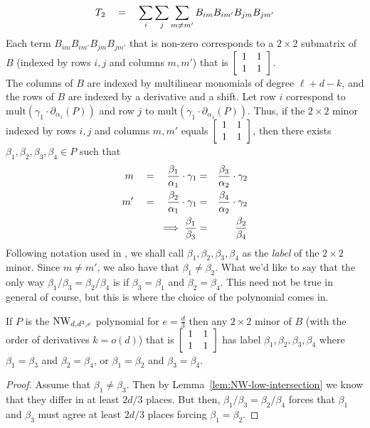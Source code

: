 \[
T_2 \quad = \quad \sum_i \sum_j \sum_{m\neq m'} B_{im}B_{im'}B_{jm}B_{jm'}
\]
Each term $B_{im}B_{im'}B_{jm}B_{jm'}$ that is non-zero corresponds to a $2\times 2$ submatrix of $B$ (indexed by rows $i,j$ and columns $m,m'$) that is $\left[\begin{array}{cc} 1 & 1\\ 1&1
  \end{array}\right]$. \\

The columns of $B$ are indexed by multilinear monomials of degree $\ell + d - k$, and the rows of $B$ are indexed by a derivative and a shift. Let row $i$ correspond to $\mathrm{mult}(\gamma_1 \cdot \partial_{\alpha_1}(P))$ and row $j$ to $\mathrm{mult}(\gamma_1 \cdot \partial_{\alpha_1}(P))$. Thus, if the $2\times 2$ minor indexed by rows $i,j$ and columns $m,m'$ equals $\left[\begin{array}{cc} 1 & 1\\ 1&1 \end{array}\right]$, then there exists $\beta_1, \beta_2,\beta_3,\beta_4 \in P$ such that
\begin{eqnarray*}
m \quad = \quad \frac{\beta_1}{\alpha_1}\cdot \gamma_1 & = & \frac{\beta_3}{\alpha_2} \cdot  \gamma_2\\
m' \quad = \quad \frac{\beta_2}{\alpha_1}\cdot \gamma_1 & = & \frac{\beta_4}{\alpha_2}\cdot \gamma_2\\
\implies \frac{\beta_1}{\beta_3} & = & \frac{\beta_2}{\beta_4}
\end{eqnarray*}
Following notation used in \cite{KLSS}, we shall call $\beta_1,\beta_2,\beta_3,\beta_4$ as the \emph{label} of the $2\times 2$ minor. 
Since $m\neq m'$, we also have that $\beta_1 \neq \beta_2$. What we'd like to say that the only way $\beta_1/\beta_3 = \beta_2/\beta_4$ is if $\beta_3 = \beta_1$ and $\beta_2 = \beta_4$. This need not be true in general of course, but this is where the choice of the polynomial comes in. 

\begin{claim}
If $P$ is the $\mathrm{NW}_{d,d^3, e}$ polynomial for $e = \frac{d}{3}$ then any $2\times 2$ minor of $B$ (with the order of derivatives $k = o(d)$) that is $\left[\begin{array}{cc} 1&1\\1&1\end{array}\right]$ has label $\beta_1,\beta_2,\beta_3,\beta_4$ where $\beta_1 = \beta_3$ and $\beta_2 = \beta_4$, or $\beta_1 = \beta_2$ and $\beta_3 = \beta_4$. 
\end{claim}
\begin{proof}
Assume that $\beta_1 \neq \beta_3$. Then by Lemma~\ref{lem:NW-low-intersection} we know that they differ in at least $2d/3$ places. But then, $\beta_1/\beta_3 = \beta_2/\beta_4$ forces that $\beta_1$ and $\beta_3$ must agree at least $2d/3$ places forcing $\beta_1 = \beta_2$. 
\end{proof}

